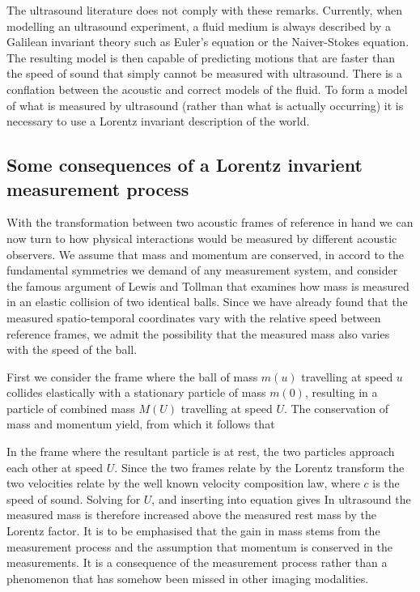 The ultrasound literature does not comply with these remarks.
Currently, when modelling an ultrasound experiment, a fluid medium is always described by a Galilean invariant theory such as Euler's equation or the Naiver-Stokes equation.
The resulting model is then capable of predicting motions that are faster than the speed of sound
that simply cannot be measured with ultrasound.
There is a conflation between the acoustic and correct models of the fluid.
To form a model of what is measured by ultrasound (rather than what is actually occurring)
it is necessary to use a Lorentz invariant description of the world.

\subsection{Some  consequences of a Lorentz invarient measurement process}

With the transformation between two acoustic frames of reference in hand
we can now turn to how physical interactions would be measured  by different acoustic observers.
We assume that mass and momentum are conserved,
in accord to the fundamental symmetries we demand of any measurement system,
and consider the famous argument of Lewis and Tollman\cite{Lewis1909, Pauli1958, Inverno1992}
that examines how mass is measured in an elastic collision of two identical balls.
Since we have already found that the measured spatio-temporal coordinates vary with the relative speed between reference frames,
we admit the possibility that the measured mass also varies with the speed of the ball.


First we consider the frame where the ball of mass $m(u)$ travelling at speed $u$ collides elastically
with a stationary particle of mass $m(0)$, resulting in a particle of combined mass $M(U)$ travelling at speed $U$.
The conservation of mass and momentum yield,
from which it follows that

In the frame where the resultant particle is at rest,
the two particles approach each other at speed $U$.
Since the two frames relate by the Lorentz transform the two velocities relate by the well known velocity composition law,
where $c$ is the speed of sound.
Solving for $U$,
and inserting into equation  gives
In ultrasound the measured mass is therefore increased above the measured rest mass
by the Lorentz factor.
It is to be emphasised
that the gain in mass   stems from the measurement process and the assumption that momentum is conserved in the measurements.
It is a consequence of the measurement process rather than a phenomenon that has somehow been missed in other imaging modalities.

